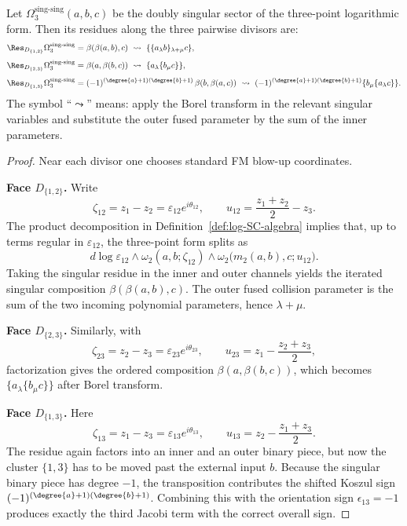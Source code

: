 \begin{lemma}
\label{lem:PVA3_proof}
Let $\Omega_3^{\mathrm{sing}\text{-}\mathrm{sing}}(a,b,c)$ be the doubly singular sector of the
three-point logarithmic form. Then its residues along the three pairwise divisors are:
\begin{align}
\label{eq:res12-jac}
\Res_{D_{\{1,2\}}}\Omega_3^{\mathrm{sing}\text{-}\mathrm{sing}}
&=
\beta(\beta(a,b),c)\ \leadsto\ \{\{a_\lambda b\}_{\lambda+\mu}c\},\\[4pt]
\label{eq:res23-jac}
\Res_{D_{\{2,3\}}}\Omega_3^{\mathrm{sing}\text{-}\mathrm{sing}}
&=
\beta(a,\beta(b,c))\ \leadsto\ \{a_\lambda\{b_\mu c\}\},\\[4pt]
\label{eq:res13-jac}
\Res_{D_{\{1,3\}}}\Omega_3^{\mathrm{sing}\text{-}\mathrm{sing}}
&=
(-1)^{(\degree{a}+1)(\degree{b}+1)}
\,\beta(b,\beta(a,c))
\ \leadsto\
(-1)^{(\degree{a}+1)(\degree{b}+1)}
\{b_\mu\{a_\lambda c\}\}.
\end{align}
The symbol ``$\leadsto$'' means: apply the Borel transform in the relevant singular
variables and substitute the outer fused parameter by the sum of the inner parameters.
\end{lemma}

\begin{proof}
Near each divisor one chooses standard FM blow-up coordinates.

\smallskip
\noindent\textbf{Face $D_{\{1,2\}}$.}
Write
\[
\zeta_{12}=z_1-z_2=\varepsilon_{12}e^{i\theta_{12}},
\qquad
u_{12}=\frac{z_1+z_2}{2}-z_3.
\]
The product decomposition in Definition~\ref{def:log-SC-algebra} implies that, up to terms regular in $\varepsilon_{12}$,
the three-point form splits as
\[
d\log\varepsilon_{12}\wedge
\omega_2(a,b;\zeta_{12})
\wedge
\omega_2\bigl(m_2(a,b),c;u_{12}\bigr).
\]
Taking the singular residue in the inner and outer channels yields the iterated singular
composition $\beta(\beta(a,b),c)$. The outer fused collision parameter is the sum of
the two incoming polynomial parameters, hence $\lambda+\mu$.

\smallskip
\noindent\textbf{Face $D_{\{2,3\}}$.}
Similarly, with
\[
\zeta_{23}=z_2-z_3=\varepsilon_{23}e^{i\theta_{23}},
\qquad
u_{23}=z_1-\frac{z_2+z_3}{2},
\]
factorization gives the ordered composition $\beta(a,\beta(b,c))$, which becomes
$\{a_\lambda\{b_\mu c\}\}$ after Borel transform.

\smallskip
\noindent\textbf{Face $D_{\{1,3\}}$.}
Here
\[
\zeta_{13}=z_1-z_3=\varepsilon_{13}e^{i\theta_{13}},
\qquad
u_{13}=z_2-\frac{z_1+z_3}{2}.
\]
The residue again factors into an inner and an outer binary piece, but now the
cluster $\{1,3\}$ has to be moved past the external input $b$. Because the singular
binary piece has degree $-1$, the transposition contributes the shifted Koszul sign
$(-1)^{(\degree{a}+1)(\degree{b}+1)}$. Combining this with the orientation sign
$\epsilon_{13}=-1$ produces exactly the third Jacobi term with the correct overall sign.
\end{proof}

